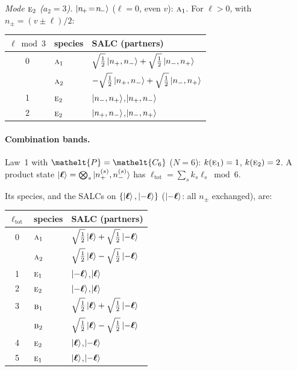 \documentclass[11pt]{article}
\newcommand{\eltfont}[1]{{\let\sigma\eltsigma\mathelt{#1}}}
\newcommand{\irr}[1]{\text{\normalfont\scshape #1}}
\newcommand{\elt}[1]{\eltfont{#1}}
\newcommand{\pel}{\elt{P}}             %
\begin{document}
\emph{Mode $\irr{e}_{2}$ ($a_2=3$).} $\ket{n_{\!+}\!=\!n_{\!-}}$ ($\ell=0$, even $v$): $\irr{a}_{1}$. For $\ell>0$, with $n_\pm=(v\pm\ell)/2$:
\begin{longtable}{c l l}\hline $\ell\bmod 3$ & species & SALC (partners)\\ \hline\endhead
0 & $\irr{a}_{1}$ & $\sqrt{\tfrac{1}{2}}\ket{n_+,n_-}+\sqrt{\tfrac{1}{2}}\ket{n_-,n_+}$\\
 & $\irr{a}_{2}$ & $-\sqrt{\tfrac{1}{2}}\ket{n_+,n_-}+\sqrt{\tfrac{1}{2}}\ket{n_-,n_+}$\\
1 & $\irr{e}_{2}$ & $\ket{n_-,n_+}$,\quad $\ket{n_+,n_-}$\\
2 & $\irr{e}_{2}$ & $\ket{n_+,n_-}$,\quad $\ket{n_-,n_+}$\\
\hline\end{longtable}

\paragraph{Combination bands.}

Law~1 with $\pel=\elt{C_{6}}$ ($N=6$): $k(\irr{e}_{1})=1$, $k(\irr{e}_{2})=2$. A product state $\ket{\boldsymbol\ell}=\bigotimes_s\ket{n_+^{(s)},n_-^{(s)}}$ has $\ell_{\mathrm{tot}}=\sum_sk_s\ell_s\bmod 6$.

Its species, and the SALCs on $\{\ket{\boldsymbol\ell},\ket{-\boldsymbol\ell}\}$ ($\ket{-\boldsymbol\ell}$: all $n_\pm$ exchanged), are:

\begin{longtable}{c l l}\hline $\ell_{\mathrm{tot}}$ & species & SALC (partners)\\ \hline\endhead

0 & $\irr{a}_{1}$ & $\sqrt{\tfrac{1}{2}}\ket{\boldsymbol\ell}+\sqrt{\tfrac{1}{2}}\ket{-\boldsymbol\ell}$\\

 & $\irr{a}_{2}$ & $\sqrt{\tfrac{1}{2}}\ket{\boldsymbol\ell}-\sqrt{\tfrac{1}{2}}\ket{-\boldsymbol\ell}$\\

1 & $\irr{e}_{1}$ & $\ket{-\boldsymbol\ell}$,\quad $\ket{\boldsymbol\ell}$\\

2 & $\irr{e}_{2}$ & $\ket{-\boldsymbol\ell}$,\quad $\ket{\boldsymbol\ell}$\\

3 & $\irr{b}_{1}$ & $\sqrt{\tfrac{1}{2}}\ket{\boldsymbol\ell}+\sqrt{\tfrac{1}{2}}\ket{-\boldsymbol\ell}$\\

 & $\irr{b}_{2}$ & $\sqrt{\tfrac{1}{2}}\ket{\boldsymbol\ell}-\sqrt{\tfrac{1}{2}}\ket{-\boldsymbol\ell}$\\

4 & $\irr{e}_{2}$ & $\ket{\boldsymbol\ell}$,\quad $\ket{-\boldsymbol\ell}$\\

5 & $\irr{e}_{1}$ & $\ket{\boldsymbol\ell}$,\quad $\ket{-\boldsymbol\ell}$\\

\hline\end{longtable}
\end{document}
